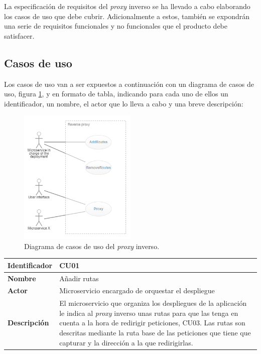 \documentclass[11pt,spanish,listoffigures]{tfgetsinf}
\begin{document}
La especificación de requisitos del \emph{proxy} inverso se ha llevado a cabo elaborando los casos de uso que debe cubrir. Adicionalmente a estos, también se expondrán una serie de requisitos funcionales y no funcionales que el producto debe satisfacer.


		\subsection{Casos de uso} \label{casosDeUso}

Los casos de uso van a ser expuestos a continuación con un diagrama de casos de uso, figura \ref{diagramaCasosDeUso}, y en formato de tabla, indicando para cada uno de ellos un identificador, un nombre, el actor que lo lleva a cabo y una breve descripción:

\begin{figure}[ht]
\centering
\includegraphics[width=0.5\textwidth]{imagenes/diagramaCasosDeUso}
\caption{Diagrama de casos de uso del \emph{proxy} inverso.}
	\label{diagramaCasosDeUso}
\end{figure}

\begin{center} \begin{tabular}{| l | p{11.3cm} |}
\hline
\textbf{Identificador} & CU01
\\ \hline
\textbf{Nombre} & Añadir rutas
\\ \hline
\textbf{Actor} & Microservicio encargado de orquestar el despliegue
\\ \hline
\textbf{Descripción} & El microservicio que organiza los despliegues de la aplicación le indica al \emph{proxy} inverso unas rutas para que las tenga en cuenta a la hora de redirigir peticiones, CU03. Las rutas son descritas mediante la ruta base de las peticiones que tiene que capturar y la dirección a la que redirigirlas.
\\ \hline \end{tabular} \end{center}
\end{document}

